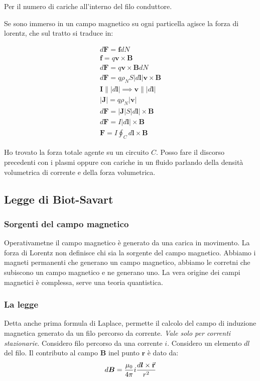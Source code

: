 \documentclass[a4paper]{scrarticle}
\begin{document}
Per il numero di cariche all'interno del filo conduttore.

Se sono immerso in un campo magnetico su ogni particella agisce la forza di lorentz, che sul tratto si traduce in:

\begin{gather*}
    d \bm F = \bm f  dN\\
    \bm f = q \bm v \times \bm B\\
    d \bm F = q \bm v \times \bm B  dN\\
    d \bm F = q \rho_N S |d\bm l| \bm v \times \bm B\\
    \bm I \parallel |d \bm l| \implies \bm v \parallel |d \bm l|\\
    |\bm J| = q \rho_N |\bm v|\\ 
    d \bm F = |\bm J| S |d\bm l| \times \bm B\\
    d \bm F = I |d\bm l| \times \bm B\\
    \bm F = I \oint_C d\bm l \times \bm B
\end{gather*}

Ho trovato la forza totale agente su un circuito $C$.
Posso fare il discorso precedenti con i plasmi oppure  con cariche in un fluido parlando della densità volumetrica di corrente e della forza volumetrica.

\subsection{Legge di Biot-Savart}
\subsubsection*{Sorgenti del campo magnetico}

Operativametne il campo magnetico è generato da una carica in movimento. La forza di Lorentz non definisce chi sia la sorgente del campo magnetico. Abbiamo i magneti permanenti che generano un campo magnetico, abbiamo le corretni che subiscono un campo magnetico e ne generano uno. La vera origine dei campi magnetici è complessa, serve una teoria quantistica.

\subsubsection*{La legge}

Detta anche prima formula di Laplace, permette il calcolo del campo di induzione magnetica generato da un filo percorso da corrente. \emph{Vale solo per correnti stazionarie}. 
Considero filo percorso da una corrente $i$. Considero un elemento $dl$ del filo. Il contributo al campo $\bm B$ inel punto $\bm r$ è dato da:
\begin{equation}
d \bm B = \frac{\mu_0}{4\pi}i \frac{d \bm l \times \va r}{r^2}
\end{equation}
\end{document}

